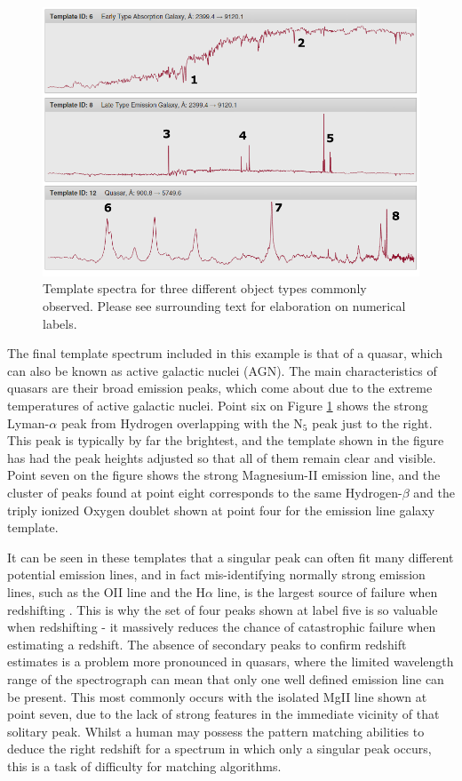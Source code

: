 \documentclass[titlesmallcaps, examinerscopy, copyrightpage]{uqthesis}
\begin{document}
\begin{figure}[ht!]
\includegraphics[width=1\textwidth]{images/types.png} 
\centering
\caption{Template spectra for three different object types commonly observed. Please see surrounding text for elaboration on numerical labels.}
\label{fig:types}
\end{figure}

The final template spectrum included in this example is that of a quasar, which can also be known as active galactic nuclei (AGN). The main characteristics of quasars are their broad emission peaks, which come about due to the extreme temperatures of active galactic nuclei. Point six on Figure \ref{fig:types} shows the strong Lyman-$\alpha$ peak from Hydrogen overlapping with the N$_5$ peak just to the right. This peak is typically by far the brightest, and the template shown in the figure has had the peak heights adjusted so that all of them remain clear and visible. Point seven on the figure shows the strong Magnesium-II emission line, and the cluster of peaks found at point eight corresponds to the same Hydrogen-$\beta$ and the triply ionized Oxygen doublet shown at point four for the emission line galaxy template.

It can be seen in these templates that a singular peak can often fit many different potential emission lines, and in fact mis-identifying normally strong emission lines, such as the OII line and the H$\alpha$ line, is the largest source of failure when redshifting \cite{Drinkwater21012010}. This is why the set of four peaks shown at label five is so valuable when redshifting - it massively reduces the chance of catastrophic failure when estimating a redshift. The absence of secondary peaks to confirm redshift estimates is a problem more pronounced in quasars, where the limited wavelength range of the spectrograph can mean that only one well defined emission line can be present. This most commonly occurs with the isolated MgII line shown at point seven, due to the lack of strong features in the immediate vicinity of that solitary peak. Whilst a human may possess the pattern matching abilities to deduce the right redshift for a spectrum in which only a singular peak occurs, this is a task of difficulty for matching algorithms.
\end{document}
